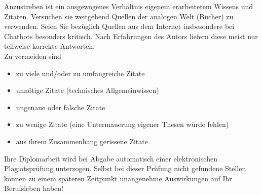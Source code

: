 \renewcommand*{\authorOfNextLines}{Helmut Quinz}
Anzustreben ist ein ausgewogenes Verhältnis eigenem erarbeitetem Wissens und Zitaten.
Versuchen sie weitgehend Quellen der analogen Welt (Bücher) zu verwenden. 
Seien Sie bezüglich Quellen aus dem Internet insbesondere bei Chatbots besonders kritisch.
Nach Erfahrungen des Autors liefern diese meist nur teilweise korrekte Antworten.\\
Zu vermeiden sind
\begin{itemize}
	\item zu viele und\slash oder zu umfangreiche Zitate
	\item unnötige Zitate (\zB technisches Allgemeinwissen)
	\item ungenaue oder falsche Zitate
	\item zu wenige Zitate (eine Untermauerung eigener Thesen würde fehlen)
	\item aus ihrem Zusammenhang gerissene Zitate
\end{itemize}

Ihre Diplomarbeit wird bei Abgabe automatisch einer elektronischen Plagiatsprüfung unterzogen.
Selbst bei dieser Prüfung nicht gefundene  Stellen können zu einem späteren Zeitpunkt unangenehme Auswirkungen auf Ihr Berufsleben haben! 
\FloatBarrier